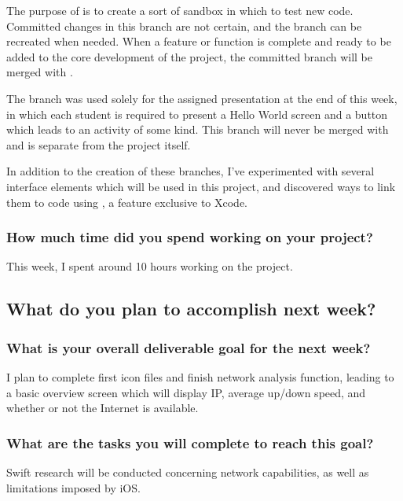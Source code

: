 \documentclass[letterpaper]{article}            %
\begin{document}
The purpose of  is to create a sort of sandbox in which to test new code. Committed changes in this branch are not certain, and the branch can be recreated when needed. When a feature or function is complete and ready to be added to the core development of the project, the committed branch will be merged with .

The  branch was used solely for the assigned presentation at the end of this week, in which each student is required to present a Hello World screen and a button which leads to an activity of some kind. This branch will never be merged with  and is separate from the project itself.

In addition to the creation of these branches, I've experimented with several interface elements which will be used in this project, and discovered ways to link them to code using , a feature exclusive to Xcode.

\subsubsection{How much time did you spend working on your project?}

This week, I spent around 10 hours working on the project.


\subsection{What do you plan to accomplish next week?}

\subsubsection{What is your overall deliverable goal for the next week?}

I plan to complete first icon files and finish network analysis function, leading to a basic overview screen which will display IP, average up/down speed, and whether or not the Internet is available.

\subsubsection{What are the tasks you will complete to reach this goal?}

Swift research will be conducted concerning network capabilities, as well as limitations imposed by iOS.
\end{document}

